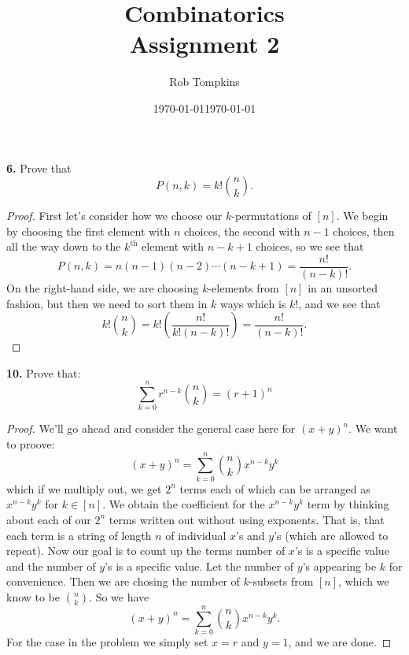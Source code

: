 \documentclass[12pt]{amsart}
\title{Combinatorics\\Assignment 2}
\author{Rob Tompkins}
\date{\today}
\begin{document}
    \maketitle
    \date{\today}
    \begin{onehalfspace}
        \noindent\textbf{6.} Prove that $$P(n,k) = k!\binom{n}{k}.$$
        \begin{proof}
            First let's consider how we choose our $k$-permutations of $[n]$.
            We begin by choosing the first element with $n$ choices, the second with $n-1$ choices, then all the way down to the $k^{\text{th}}$ element with $n-k+1$ choices, so we see that
            \begin{displaymath}
                P(n,k) = n(n-1)(n-2)\cdots(n-k+1) = \frac{n!}{(n-k)!}.
            \end{displaymath}
            On the right-hand side, we are choosing $k$-elements from $[n]$ in an unsorted fashion, but then
            we need to sort them in $k$ ways which is $k!$, and we see that
            \begin{displaymath}
                k!\binom{n}{k} = k!\left(\frac{n!}{k!(n-k)!}\right) = \frac{n!}{(n-k)!}.
            \end{displaymath}
        \end{proof}

        \textbf{10.} Prove that:
        \begin{displaymath}\sum_{k=0}^n r^{n-k}\binom{n}{k} = (r + 1)^n
        \end{displaymath}
        \begin{proof}
            We'll go ahead and consider the general case here for $(x+y)^n$.
            We want to proove:
            \begin{displaymath}
                (x+y)^n = \sum_{k=0}^n\binom{n}{k}x^{n-k}y^k
            \end{displaymath}
            which if we multiply out, we get $2^n$ terms each of which can be arranged as $x^{n-k}y^k$ for $k\in[n]$.
            We obtain the coefficient for the $x^{n-k}y^k$ term by thinking about each of our $2^n$ terms written out
            without using exponents.
            That is, that each term is a string of length $n$ of individual $x$'s and $y$'s (which are allowed to repeat).
            Now our goal is to count up the terms number of $x$'s is a specific value and the number of $y$'s is a specific value.
            Let the number of $y$'s appearing be $k$ for convenience.
            Then we are chosing the number of $k$-subsets from $[n]$, which we know to be $\binom{n}{k}$.
            So we have
            \begin{displaymath}
                (x + y)^n = \sum_{k=0}^n\binom{n}{k}x^{n-k}y^k.
            \end{displaymath}
            For the case in the problem we simply set $x=r$ and $y=1$, and we are done.


\end{proof}
\end{onehalfspace}
\end{document}
